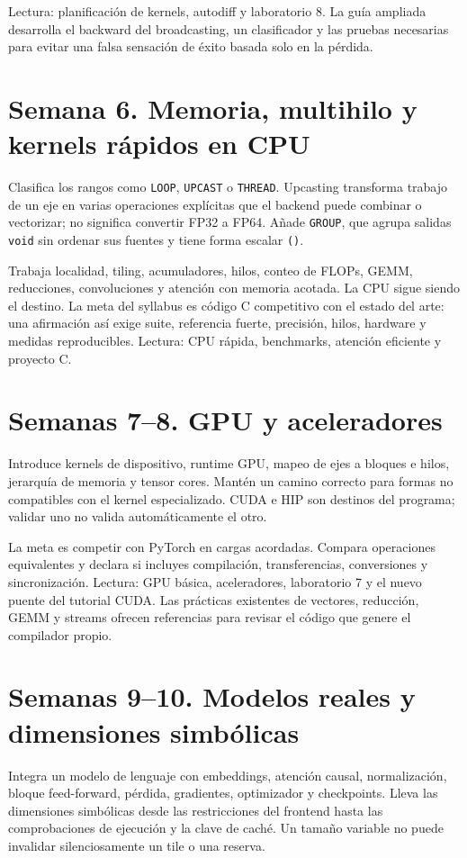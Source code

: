 \documentclass[12pt,a4paper,oneside]{report}
\begin{document}
Lectura: planificación de kernels, autodiff y laboratorio 8. La guía ampliada desarrolla el backward del broadcasting, un clasificador y las pruebas necesarias para evitar una falsa sensación de éxito basada solo en la pérdida.

\section{Semana 6. Memoria, multihilo y kernels rápidos en CPU}
Clasifica los rangos como \texttt{LOOP}, \texttt{UPCAST} o \texttt{THREAD}. Upcasting transforma trabajo de un eje en varias operaciones explícitas que el backend puede combinar o vectorizar; no significa convertir FP32 a FP64. Añade \texttt{GROUP}, que agrupa salidas \texttt{void} sin ordenar sus fuentes y tiene forma escalar \texttt{()}.

Trabaja localidad, tiling, acumuladores, hilos, conteo de FLOPs, GEMM, reducciones, convoluciones y atención con memoria acotada. La CPU sigue siendo el destino. La meta del syllabus es código C competitivo con el estado del arte: una afirmación así exige suite, referencia fuerte, precisión, hilos, hardware y medidas reproducibles. Lectura: CPU rápida, benchmarks, atención eficiente y proyecto C.

\section{Semanas 7--8. GPU y aceleradores}
Introduce kernels de dispositivo, runtime GPU, mapeo de ejes a bloques e hilos, jerarquía de memoria y tensor cores. Mantén un camino correcto para formas no compatibles con el kernel especializado. CUDA e HIP son destinos del programa; validar uno no valida automáticamente el otro.

La meta es competir con PyTorch en cargas acordadas. Compara operaciones equivalentes y declara si incluyes compilación, transferencias, conversiones y sincronización. Lectura: GPU básica, aceleradores, laboratorio 7 y el nuevo puente del tutorial CUDA. Las prácticas existentes de vectores, reducción, GEMM y streams ofrecen referencias para revisar el código que genere el compilador propio.

\section{Semanas 9--10. Modelos reales y dimensiones simbólicas}
Integra un modelo de lenguaje con embeddings, atención causal, normalización, bloque feed-forward, pérdida, gradientes, optimizador y checkpoints. Lleva las dimensiones simbólicas desde las restricciones del frontend hasta las comprobaciones de ejecución y la clave de caché. Un tamaño variable no puede invalidar silenciosamente un tile o una reserva.
\end{document}
